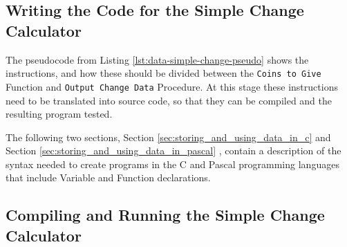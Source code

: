
\subsection{Writing the Code for the Simple Change Calculator} %
\label{sub:writing_the_code_for_simple_change}

The pseudocode from Listing \ref{lst:data-simple-change-pseudo} shows the instructions, and how these should be divided between the \texttt{Coins to Give} Function and \texttt{Output Change Data} Procedure. At this stage these instructions need to be translated into source code, so that they can be compiled and the resulting program tested.

The following two sections, Section \ref{sec:storing_and_using_data_in_c}  and Section \ref{sec:storing_and_using_data_in_pascal} , contain a description of the syntax needed to create programs in the C and Pascal programming languages that include Variable and Function declarations.



\clearpage
\subsection{Compiling and Running the Simple Change Calculator} %
\label{sub:compiling_and_running_simple_change}

